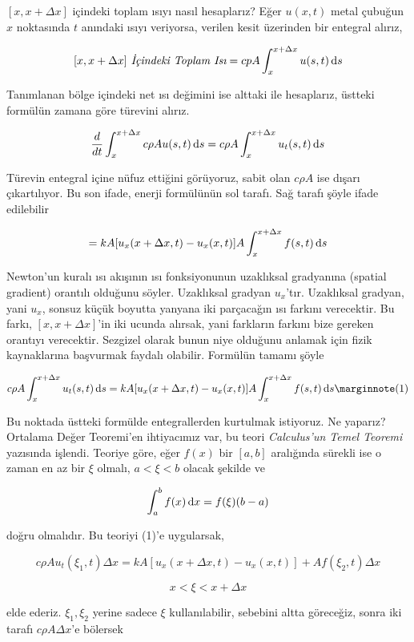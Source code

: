 \documentclass[12pt,fleqn]{article}\usepackage{../../common}
\begin{document}
$[x,x+\Delta x]$ içindeki toplam ısıyı nasıl hesaplarız? Eğer $u(x,t)$
metal çubuğun $x$ noktasında $t$ anındaki ısıyı veriyorsa, verilen kesit
üzerinden bir entegral alırız,

$$
[x,x+\Delta x] \textit{ İçindeki Toplam Isı} = 
cpA \int _{ x}^{x+\Delta x}u(s,t) \,\mathrm{d} s
$$

Tanımlanan bölge içindeki net ısı değimini ise alttaki ile hesaplarız,
üstteki formülün zamana göre türevini alırız. 

$$
\frac{d}{dt} \int _{ x}^{x+\Delta x} c\rho A u(s,t) \,\mathrm{d} s = 
c\rho A  \int _{ x}^{x+\Delta x} u_t(s,t) \,\mathrm{d} s
$$

Türevin entegral içine nüfuz ettiğini görüyoruz, sabit olan $c\rho A$ ise
dışarı çıkartılıyor. Bu son ifade, enerji formülünün sol tarafı. Sağ tarafı
şöyle ifade edilebilir

$$ = kA [ u_x(x+\Delta x,t) - u_x(x,t)] A \int _{x}^{x+\Delta x} f(s,t) \,\mathrm{d} s $$

Newton'un kuralı ısı akışının ısı fonksiyonunun uzaklıksal gradyanına
(spatial gradient) orantılı olduğunu söyler. Uzaklıksal gradyan
$u_x$'tır. Uzaklıksal gradyan, yani $u_x$, sonsuz küçük boyutta yanyana iki
parçacağın ısı farkını verecektir. Bu farkı, $[x,x+\Delta x]$'in iki ucunda
alırsak, yani farkların farkını bize gereken orantıyı verecektir. Sezgizel
olarak bunun niye olduğunu anlamak için fizik kaynaklarına başvurmak
faydalı olabilir. Formülün tamamı şöyle

$$
c\rho A  \int _{ x}^{x+\Delta x} u_t(s,t) \ud s =
kA [ u_x(x+\Delta x,t) - u_x(x,t)] A \int _{x}^{x+\Delta x} f(s,t) \ud s 
\mlabel{1}
$$

Bu noktada üstteki formülde entegrallerden kurtulmak istiyoruz. Ne
yaparız?  Ortalama Değer Teoremi'en ihtiyacımız var, bu teori {\em
  Calculus'un Temel Teoremi} yazısında işlendi. Teoriye göre, eğer $f(x)$
bir $[a,b]$ aralığında sürekli ise o zaman en az bir $\xi$ olmalı, $a <
\xi < b$ olacak şekilde ve

$$ \int _{ a}^{b} f(x) \,\mathrm{d} x = f(\xi)(b-a)  $$

doğru olmalıdır. Bu teoriyi (1)'e uygularsak,

$$ c\rho A u_t(\xi_1,t)\Delta x = 
kA[u_x(x+\Delta x, t) - u_x(x,t)] + 
Af(\xi_2,t)\Delta x
 $$

$$ x < \xi < x+\Delta x $$

elde ederiz. $\xi_1,\xi_2$ yerine sadece $\xi$ kullanılabilir, sebebini
altta göreceğiz, sonra iki tarafı $c\rho A \Delta x$'e bölersek
\end{document}
